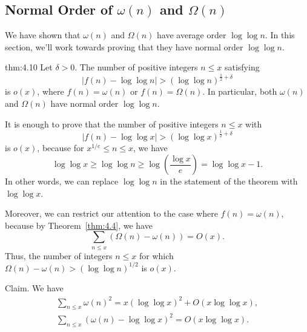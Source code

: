 \subsection{Normal Order of $\omega(n)$ and $\Omega(n)$}\label{subsec:4.4}
We have shown that $\omega(n)$ and $\Omega(n)$ have average order $\log\log n$. 
In this section, we'll work towards proving that they have normal order $\log\log n$. 

\begin{theo}{thm:4.10}
    Let $\delta > 0$. The number of positive integers $n \leq x$ satisfying 
    \[ |f(n) - \log\log n| > (\log\log n)^{\frac12+\delta} \] 
    is $o(x)$, where $f(n) = \omega(n)$ or $f(n) = \Omega(n)$. In particular, 
    both $\omega(n)$ and $\Omega(n)$ have normal order $\log\log n$. 
\end{theo}
\begin{pf}
    It is enough to prove that the number of positive integers $n \leq x$ with 
    \[ |f(n) - \log\log x| > (\log\log x)^{\frac12+\delta} \] 
    is $o(x)$, because for $x^{1/e} \leq n \leq x$, we have 
    \[ \log\log x \geq \log\log n \geq \log\left(\frac{\log x}e\right) = 
    \log\log x - 1. \] 
    In other words, we can replace $\log\log n$ in the statement of the theorem 
    with $\log\log x$. 

    Moreover, we can restrict our attention to the case where $f(n) = \omega(n)$, 
    because by Theorem~\ref{thm:4.4}, we have 
    \[ \sum_{n\leq x} (\Omega(n) - \omega(n)) = O(x). \] 
    Thus, the number of integers $n \leq x$ for which $\Omega(n) - \omega(n) 
    > (\log\log n)^{1/2}$ is $o(x)$. 

    {\sc Claim.} We have 
    \begin{align*}
        \sum_{n\leq x} \omega(n)^2 = x(\log\log x)^2 + O(x\log\log x), \\ 
        \sum_{n\leq x} (\omega(n) - \log\log x)^2 = O(x\log\log x). 
    \end{align*}


\end{pf}
